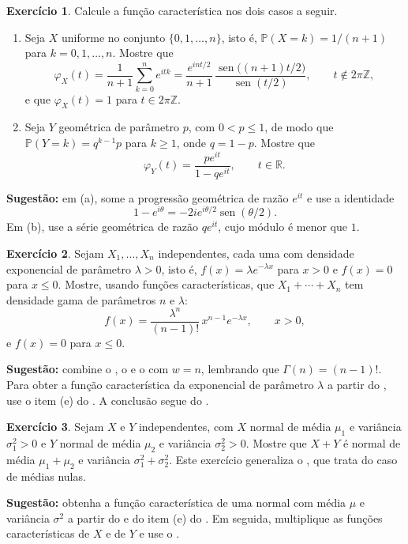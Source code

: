 \documentclass[12pt,portuguese]{article}
\theoremstyle{definition}
\theoremstyle{plainexercise}
\newtheorem{exercise}{Exercício}
\theoremstyle{starredexercise}
\theoremstyle{definition}
\renewcommand{\sin}{\operatorname{sen}}
\begin{document}
\begin{exercise}\label{exercise:uniforme-discreta-geometrica}
Calcule a função característica nos dois casos a seguir.
\begin{enumerate}[label=(\alph*)]
\item Seja $X$ uniforme no conjunto $\{0,1,\ldots,n\}$, isto é,
$\mathbb{P}(X=k)=1/(n+1)$ para $k=0,1,\ldots,n$. Mostre que
\[
\varphi_X(t)=\frac{1}{n+1}\sum_{k=0}^{n}e^{itk}
=\frac{e^{int/2}}{n+1}\,
\frac{\sin\bigl((n+1)t/2\bigr)}{\sin(t/2)},
\qquad t\notin2\pi\mathbb{Z},
\]
e que $\varphi_X(t)=1$ para $t\in2\pi\mathbb{Z}$.

\item Seja $Y$ geométrica de parâmetro $p$, com $0<p\leqslant1$, de modo que
$\mathbb{P}(Y=k)=q^{k-1}p$ para $k\geqslant1$, onde $q=1-p$. Mostre que
\[
\varphi_Y(t)=\frac{pe^{it}}{1-qe^{it}}, \qquad t\in\mathbb{R}.
\]
\end{enumerate}

\noindent\textbf{Sugestão:} em (a), some a progressão geométrica de razão $e^{it}$ e use a
identidade
\[
1-e^{i\theta}=-2ie^{i\theta/2}\sin(\theta/2).
\]
Em (b), use a série geométrica de razão $qe^{it}$, cujo módulo é menor que $1$.
\end{exercise}

\begin{exercise}\label{exercise:ross-7-51}
Sejam $X_1,\ldots,X_n$ independentes, cada uma com densidade exponencial de
parâmetro $\lambda>0$, isto é, $f(x)=\lambda e^{-\lambda x}$ para $x>0$ e
$f(x)=0$ para $x\leqslant0$.
Mostre, usando funções características, que $X_1+\cdots+X_n$ tem densidade
gama de parâmetros $n$ e $\lambda$:
\[
f(x)=\frac{\lambda^{n}}{(n-1)!}\,x^{n-1}e^{-\lambda x},
\qquad x>0,
\]
e $f(x)=0$ para $x\leqslant0$.

\noindent\textbf{Sugestão:} combine o , o
 e o  com $w=n$, lembrando que
$\Gamma(n)=(n-1)!$. Para obter a função característica da exponencial de
parâmetro $\lambda$ a partir do , use o item (e) do
. A conclusão segue do
.
\end{exercise}

\begin{exercise}\label{exercise:soma-normais-geral}
Sejam $X$ e $Y$ independentes, com $X$ normal de média $\mu_1$ e variância
$\sigma_1^2>0$ e $Y$ normal de média $\mu_2$ e variância $\sigma_2^2>0$. Mostre
que $X+Y$ é normal de média $\mu_1+\mu_2$ e variância
$\sigma_1^2+\sigma_2^2$. Este exercício generaliza o
, que trata do caso de médias nulas.

\noindent\textbf{Sugestão:} obtenha a função característica de uma normal com média $\mu$
e variância $\sigma^2$ a partir do  e do item (e) do
. Em seguida, multiplique as funções características
de $X$ e de $Y$ e use o .
\end{exercise}
\end{document}
